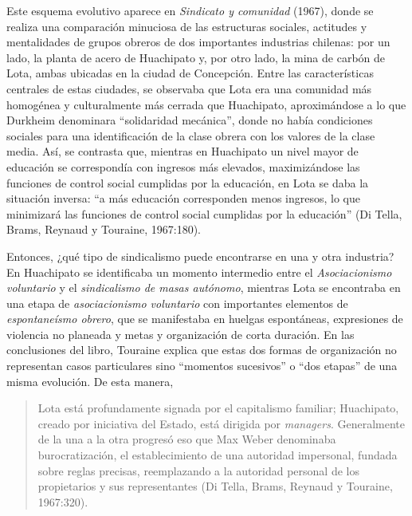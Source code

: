 Este esquema evolutivo aparece en \emph{Sindicato y comunidad} (1967), donde se realiza una comparación minuciosa de las estructuras sociales, actitudes y mentalidades de grupos obreros de dos importantes industrias chilenas: por un lado, la planta de acero de Huachipato y, por otro lado, la mina de carbón de Lota, ambas ubicadas en la ciudad de Concepción. Entre las características centrales de estas ciudades, se observaba que Lota era una comunidad más homogénea y culturalmente más cerrada que Huachipato, aproximándose a lo que Durkheim denominara ``solidaridad mecánica'', donde no había condiciones sociales para una identificación de la clase obrera con los valores de la clase media. Así, se contrasta que, mientras en Huachipato un nivel mayor de educación se correspondía con ingresos más elevados, maximizándose las funciones de control social cumplidas por la educación, en Lota se daba la situación inversa: ``a más educación corresponden menos ingresos, lo que minimizará las funciones de control social cumplidas por la educación'' (Di Tella, Brams, Reynaud y Touraine, 1967:180).

Entonces, ¿qué tipo de sindicalismo puede encontrarse en una y otra industria? En Huachipato se identificaba un momento intermedio entre el \emph{Asociacionismo voluntario} y el \emph{sindicalismo de masas autónomo}, mientras Lota se encontraba en una etapa de \emph{asociacionismo voluntario} con importantes elementos de \emph{espontaneísmo obrero}, que se manifestaba en huelgas espontáneas, expresiones de violencia no planeada y metas y organización de corta duración. En las conclusiones del libro, Touraine explica que estas dos formas de organización no representan casos particulares sino ``momentos sucesivos'' o ``dos etapas'' de una misma evolución. De esta manera,

\begin{quote}
Lota está profundamente signada por el capitalismo familiar; Huachipato, creado por iniciativa del Estado, está dirigida por \emph{managers}. Generalmente de la una a la otra progresó eso que Max Weber denominaba burocratización, el establecimiento de una autoridad impersonal, fundada sobre reglas precisas, reemplazando a la autoridad personal de los propietarios y sus representantes (Di Tella, Brams, Reynaud y Touraine, 1967:320).
\end{quote}


